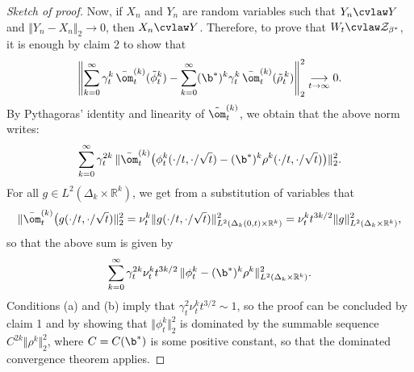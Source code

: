 \begin{proof}[Sketch of proof]
Now, if $X_n$ and $Y_n$ are random variables such that $Y_n \cvlaw Y$ and $\Vert Y_n-X_n\Vert_2 \longrightarrow 0$, then $X_n \cvlaw Y$.
Therefore, to prove that $W_t \cvlaw \mathcal{Z}_{\beta^*}$, it is enough by claim 2 to show that
\begin{equation}\left\Vert \sum_{k=0}^\infty \gamma_t^k \, \bar{\om}_t^{(k)}(\tilde{\phi}_t^k) - \sum_{k=0}^\infty (\b^*)^k \gamma_t^k\,\bar{\om}_t^{(k)}(\tilde{\rho}^{\,k}_t) \right\Vert_2^2 \underset{{t} \to {\infty}}{\longrightarrow} 0.
\end{equation}
By Pythagoras' identity and linearity of $\tilde{\om}_t^{(k)}$, we obtain that the above norm writes:
\[\sum_{k=0}^\infty \gamma_t^{2k} \, \Vert\bar{\om}_t^{(k)}\big(\phi_t^k(\cdot/t,\cdot/\sqrt{t})- (\b^*)^k\rho^{k}(\cdot/t,\cdot/\sqrt{t})\big)\Vert_2^2.\]
For all $g\in L^2(\Delta_k\times \mathbb{R}^k)$, we get from a substitution of variables that
\begin{equation*}\Vert\bar{\om}_t^{(k)}\big(g(\cdot/t,\cdot/\sqrt{t})\Vert_2^2 = \nu_t^k\Vert g(\cdot/t,\cdot/\sqrt{t})\Vert^2_{L^2(\Delta_k(0,t)\times \mathbb{R}^k)}  =  \nu_t^k t^{3k/2} \Vert g\Vert^2_{L^2(\Delta_k\times \mathbb{R}^k)},
\end{equation*}
so that the above sum is given by
\[\sum_{k=0}^\infty \gamma_t^{2k} \nu_t^k t^{3k/2} \, \Vert \phi_t^k-(\b^*)^k\rho^{k}\Vert_{L^2(\Delta_k\times \mathbb{R}^k)}^2.\]
Conditions (a) and (b) imply that $\gamma_t^2 \nu_t^k t^{3/2} \sim 1$, so the proof can be concluded by claim 1 and by showing that $\Vert \phi_t^k\Vert_2^2$ is dominated by the summable sequence $C^{2k} \Vert\rho^k\Vert^2_2$, where $C=C(\b^*)$ is some positive constant, so that the dominated convergence theorem applies.
\end{proof}


